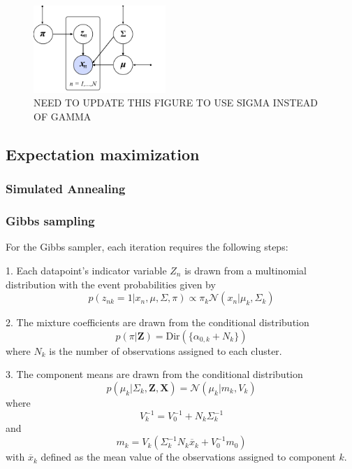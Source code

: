 \documentclass[twoside]{article}
\theoremstyle{theorem}
\theoremstyle{theorem}
\theoremstyle{theorem}
\theoremstyle{lemma}
\theoremstyle{definition}
\theoremstyle{example}
\begin{document}
\begin{figure}
\begin{center}
\includegraphics[width=50mm]{graph_model}
\caption{NEED TO UPDATE THIS FIGURE TO USE SIGMA INSTEAD OF GAMMA}
\end{center}
\end{figure}

\subsection{Expectation maximization}
\subsubsection{Simulated Annealing}
\subsubsection{Gibbs sampling}
For the Gibbs sampler, each iteration requires the following steps: 

1. Each datapoint's indicator variable $Z_n$ is drawn from a multinomial distribution with the event probabilities given by 
\begin{equation}
p(z_{nk} = 1| x_n, \mu, \Sigma, \pi)  \propto \pi_k \mathcal{N}(x_n | \mu_k, \Sigma_k)\end{equation}

2. The mixture coefficients are drawn from the conditional distribution 
\begin{equation}
p(\pi|\mathbf{Z}) = \mathrm{Dir}(\{\alpha_{0,k}+ N_k\} )
\end{equation}
where $N_k$ is the number of observations assigned to each cluster. 

3. The component means are drawn from the conditional distribution 
\begin{equation}
p(\mu_k | \Sigma_k, \mathbf{Z}, \mathbf{X}) = \mathcal{N}(\mu_k | m_k, V_k)
\end{equation}
where 
\begin{equation}
V_k^{-1} = V_0^{-1} + N_k\Sigma_k^{-1}
\end{equation}
and 
\begin{equation}
 m_k = V_k(\Sigma_k^{-1}N_k\overline{x}_k + V_0^{-1}m_0)
 \end{equation}
 with $\overline{x}_k$  defined as the mean value of the observations assigned to component $k$. 
 
\end{document}
